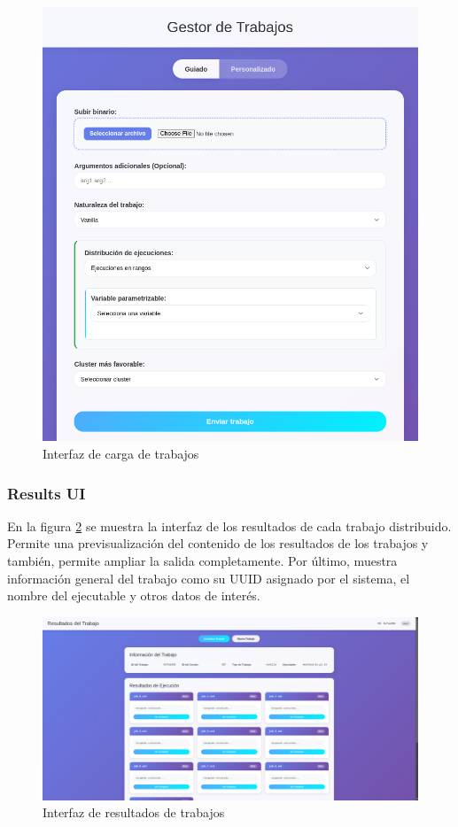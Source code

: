 \begin{figure}[H]
	\centering
	\includegraphics[scale=0.35]{tablas-images/pmv/upload-ui-screenshot.png}
	\caption{Interfaz de carga de trabajos}
	\label{fig:uiCargasTrabajos}
\end{figure}

\subsubsection{Results UI}
En la figura \ref{fig:uiResultadosTrabajos} se muestra la interfaz de los resultados de cada trabajo distribuido. Permite una previsualización del contenido de los resultados de los trabajos y también, permite ampliar la salida completamente. Por último, muestra información general del trabajo como su UUID asignado por el sistema, el nombre del ejecutable y otros datos de interés.

\begin{figure}[H]
	\centering
	\includegraphics[scale=0.35]{tablas-images/pmv/results-ui-screenshot.png}
	\caption{Interfaz de resultados de trabajos}
	\label{fig:uiResultadosTrabajos}
\end{figure}

